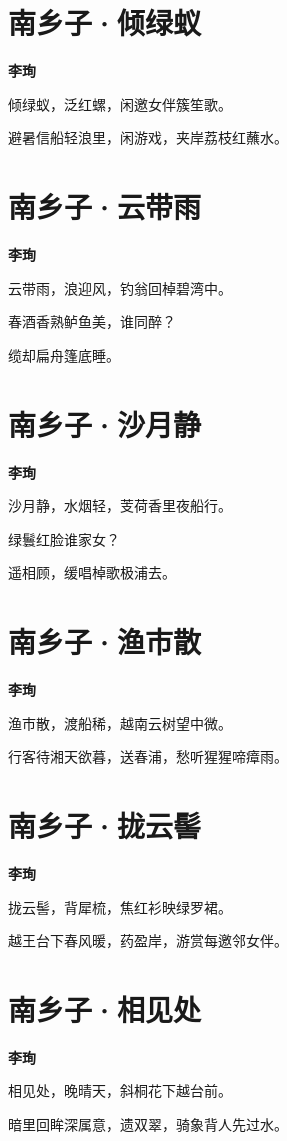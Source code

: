\documentclass[12pt,a4paper]{ctexbook}
\begin{document}
\section{南乡子·倾绿蚁}
\textbf{李珣}\par\vspace{0.5em}
倾绿蚁，泛红螺，闲邀女伴簇笙歌。\par
避暑信船轻浪里，闲游戏，夹岸荔枝红蘸水。\par

\section{南乡子·云带雨}
\textbf{李珣}\par\vspace{0.5em}
云带雨，浪迎风，钓翁回棹碧湾中。\par
春酒香熟鲈鱼美，谁同醉？\par
缆却扁舟篷底睡。\par

\section{南乡子·沙月静}
\textbf{李珣}\par\vspace{0.5em}
沙月静，水烟轻，芰荷香里夜船行。\par
绿鬟红脸谁家女？\par
遥相顾，缓唱棹歌极浦去。\par

\section{南乡子·渔市散}
\textbf{李珣}\par\vspace{0.5em}
渔市散，渡船稀，越南云树望中微。\par
行客待湘天欲暮，送春浦，愁听猩猩啼瘴雨。\par

\section{南乡子·拢云髻}
\textbf{李珣}\par\vspace{0.5em}
拢云髻，背犀梳，焦红衫映绿罗裙。\par
越王台下春风暖，药盈岸，游赏每邀邻女伴。\par

\section{南乡子·相见处}
\textbf{李珣}\par\vspace{0.5em}
相见处，晚晴天，斜桐花下越台前。\par
暗里回眸深属意，遗双翠，骑象背人先过水。\par
\end{document}

